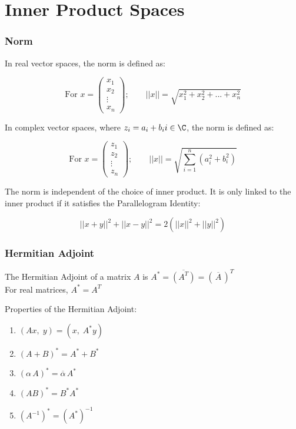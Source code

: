 \section*{Inner Product Spaces}

\subsubsection*{Norm}

In real vector spaces, the norm is defined as:

$$\text{For }x=\begin{pmatrix}x_1\\x_2\\ \vdots \\x_n\end{pmatrix};\text{ }\text{ }\text{ } ||x||=\sqrt{x_1^2+x_2^2+...+x_n^2}$$

In complex vector spaces, where $z_i=a_i+b_ii\in \C$, the norm is defined as:

$$\text{For }x=\begin{pmatrix}z_1\\z_2\\ \vdots \\z_n\end{pmatrix};\text{ }\text{ }\text{ } ||x||=\sqrt{\sum_{i=1}^{n} (a_i^2+b_i^2)}$$

The norm is independent of the choice of inner product. It is only linked to the inner product if it satisfies the Parallelogram Identity:

$$||x+y||^2+||x-y||^2=2\left(||x||^2+||y||^2\right)$$

\subsubsection*{Hermitian Adjoint}

The Hermitian Adjoint of a matrix $A$ is $A^*=\overline{(A^T)}=\left(\,\overline{A}\,\right)^T$\\

For real matrices, $A^*=A^T$

Properties of the Hermitian Adjoint:

\begin{enumerate}[label=(\roman*)]
    \item $(Ax,\;y)=(x,\;A^*y)$
    \item $(A+B)^*=A^*+B^*$
    \item $(\alpha\,A)^*=\overline{\alpha}\,A^*$
    \item $(AB)^*=B^*A^*$
    \item $(A^{-1})^*=(A^*)^{-1}$
\end{enumerate}

